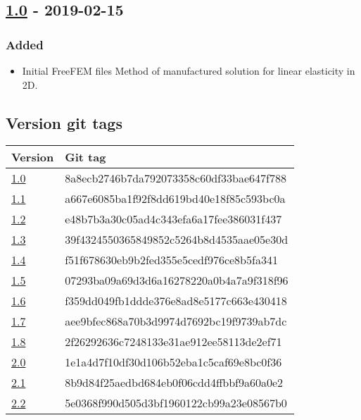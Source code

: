 \subsection{\texorpdfstring{\href{https://gitlab.com/PsdSolver/psd_sources/-/tree/v1.0}{1.0}
- 2019-02-15}{1.0 - 2019-02-15}}\label{section-11}

\subsubsection{Added}\label{added-12}

\begin{itemize}
\tightlist
\item
  Initial FreeFEM files Method of manufactured solution for linear
  elasticity in 2D.
\end{itemize}

\subsection{Version git tags}\label{version-git-tags}

\begin{longtable}[]{@{}ll@{}}
\toprule
Version & Git tag\tabularnewline
\midrule
\endhead
\href{https://gitlab.com/PsdSolver/psd_sources/-/tree/v1.0}{1.0} &
8a8ecb2746b7da792073358c60df33bae647f788\tabularnewline
\href{https://gitlab.com/PsdSolver/psd_sources/-/tree/v1.1}{1.1} &
a667e6085ba1f92f8dd619bd40e18f85c593bc0a\tabularnewline
\href{https://gitlab.com/PsdSolver/psd_sources/-/tree/v1.2}{1.2} &
e48b7b3a30c05ad4c343efa6a17fee386031f437\tabularnewline
\href{https://gitlab.com/PsdSolver/psd_sources/-/tree/v1.3}{1.3} &
39f4324550365849852c5264b8d4535aae05e30d\tabularnewline
\href{https://gitlab.com/PsdSolver/psd_sources/-/tree/v1.4}{1.4} &
f51f678630eb9b2fed355e5cedf976ce8b5fa341\tabularnewline
\href{https://gitlab.com/PsdSolver/psd_sources/-/tree/v1.5}{1.5} &
07293ba09a69d3d6a16278220a0b4a7a9f318f96\tabularnewline
\href{https://gitlab.com/PsdSolver/psd_sources/-/tree/v1.6}{1.6} &
f359dd049fb1ddde376e8ad8e5177c663e430418\tabularnewline
\href{https://gitlab.com/PsdSolver/psd_sources/-/tree/v1.7}{1.7} &
aee9bfec868a70b3d9974d7692bc19f9739ab7dc\tabularnewline
\href{https://gitlab.com/PsdSolver/psd_sources/-/tree/v1.8}{1.8} &
2f26292636c7248133e31ae912ee58113de2ef71\tabularnewline
\href{https://gitlab.com/PsdSolver/psd_sources/-/tree/v2.0}{2.0} &
1e1a4d7f10df30d106b52eba1c5caf69e8bc0f36\tabularnewline
\href{https://gitlab.com/PsdSolver/psd_sources/-/tree/v2.1}{2.1} &
8b9d84f25aedbd684eb0f06cdd4ffbbf9a60a0e2\tabularnewline
\href{https://gitlab.com/PsdSolver/psd_sources/-/tree/v2.2}{2.2} &
5e0368f990d505d3bf1960122cb99a23e08567b0\tabularnewline
\bottomrule
\end{longtable}
